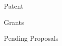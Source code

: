 \documentclass[11pt]{resume}
\begin{document}
\begin{citations}{Patent}{\bibfile}
\nocite{Reyes:Pyeatt95}
\end{citations}


\begin{citations}{Grants}{\bibfile}
\nocite{GrantC}
\nocite{GrantA}
\nocite{GrantB}
\end{citations}

\begin{citations}{Pending Proposals}{\bibfile}
\nocite{GrantProposalD}
\nocite{GrantProposalJ}
\end{citations}



\end{document}
